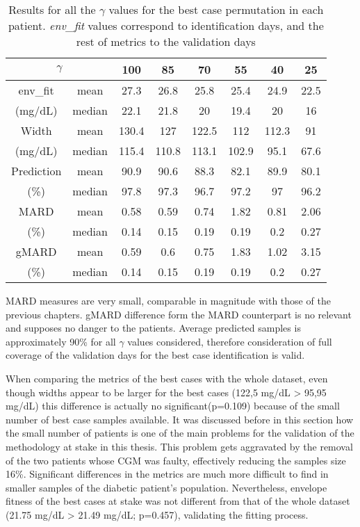 \begin{table}[hbtp]
	\centering
	\begin{tabular}{| c | c | c | c | c | c | c | c |} 
	\hline
	\multicolumn{2}{|c|}{$\gamma$} & 100 & 85 & 70 & 55 & 40 & 25 \\											
	\hline
	env\_fit & mean & 27.3 & 26.8 & 25.8 & 25.4 & 24.9 & 22.5 \\
	(mg/dL) & median & 22.1 & 21.8 & 20 & 19.4 & 20 & 16 \\
	\hline
	Width & mean & 130.4 & 127 & 122.5 & 112 & 112.3 & 91 \\
	(mg/dL) & median & 115.4 & 110.8 & 113.1 & 102.9 & 95.1 & 67.6 \\
	\hline
	Prediction & mean & 90.9 & 90.6 & 88.3 & 82.1 & 89.9 & 80.1 \\
	(\%) & median & 97.8 & 97.3 & 96.7 & 97.2 & 97 & 96.2 \\
	\hline
	MARD & mean & 0.58 & 0.59 & 0.74 & 1.82 & 0.81 & 2.06 \\
	(\%) & median & 0.14 & 0.15 & 0.19 & 0.19 & 0.2 & 0.27 \\
	\hline
	gMARD & mean & 0.59 & 0.6 & 0.75 & 1.83 & 1.02 & 3.15 \\
	(\%) & median & 0.14 & 0.15 & 0.19 & 0.19 & 0.2 & 0.27 \\
	\hline
\end{tabular}
\caption{Results for all the $\gamma$ values for the best case permutation in each patient. \textit{env\_fit} values correspond to identification days, and the rest of metrics to the validation days}
\label{tab:resultsCGMbestcase}
\end{table}

MARD measures are very small, comparable in magnitude with those of the previous chapters. gMARD difference form the MARD counterpart is no relevant and supposes no danger to the patients. Average predicted samples is approximately 90\% for all $\gamma$ values considered, therefore consideration of full coverage of the validation days for the best case identification is valid.

When comparing the metrics of the best cases with the whole dataset, even though widths appear to be larger for the best cases (122,5 mg/dL > 95,95 mg/dL) this difference is actually no significant(p=0.109) because of the small number of best case samples available. It was discussed before in this section how the small number of patients is one of the main problems for the validation of the methodology at stake in this thesis. This problem gets aggravated by the removal of the two patients whose CGM was faulty, effectively reducing the samples size 16\%. Significant differences in the metrics are much more difficult to find in smaller samples of the diabetic patient's population. Nevertheless, envelope fitness of the best cases at stake was not different from that of the whole dataset (21.75 mg/dL > 21.49 mg/dL; p=0.457), validating the fitting process.

